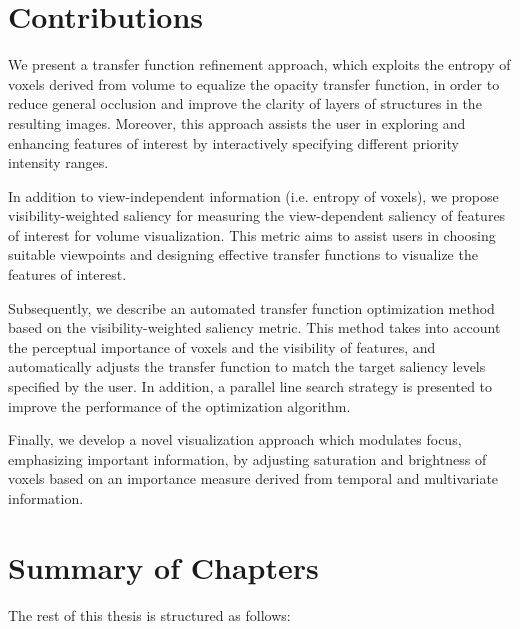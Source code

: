 
\section{Contributions}
We present a transfer function refinement approach, which exploits the entropy of voxels derived from volume to equalize the opacity transfer function, in order to reduce general occlusion and improve the clarity of layers of structures in the resulting images.
Moreover, this approach assists the user in exploring and enhancing features of interest by interactively specifying different priority intensity ranges.

In addition to view-independent information (i.e. entropy of voxels), we propose visibility-weighted saliency for measuring the view-dependent saliency of features of interest for volume visualization.
This metric aims to assist users in choosing suitable viewpoints and designing effective transfer functions to visualize the features of interest.

Subsequently, we describe an automated transfer function optimization method based on the visibility-weighted saliency metric. This method takes into account the perceptual importance of voxels and the visibility of features, and automatically adjusts the transfer function to match the target saliency levels specified by the user. In addition, a parallel line search strategy is presented to improve the performance of the optimization algorithm.

Finally, we develop a novel visualization approach which modulates focus, emphasizing important information, by adjusting saturation and brightness of voxels based on an importance measure derived from temporal and multivariate information.

\section{Summary of Chapters}
The rest of this thesis is structured as follows:

